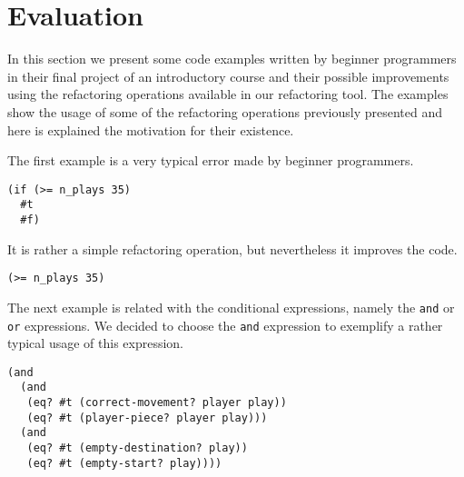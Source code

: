 

\section{Evaluation}
In this section we present some code examples written by beginner programmers
in their final project of an introductory course and their possible improvements
using the refactoring operations available in our refactoring tool.
The examples show the usage of some of the refactoring operations previously presented
and here is explained the motivation for their existence.

\lstset{style=racket}


The first example is a very typical error made by beginner programmers.
\begin{absolutelynopagebreak}
\begin{lstlisting}
(if (>= n_plays 35)
  #t
  #f)
\end{lstlisting}
It is rather a simple refactoring operation, but nevertheless it improves the code.
\begin{lstlisting}
(>= n_plays 35)
\end{lstlisting}
\end{absolutelynopagebreak}
The next example is related with the conditional expressions, namely the {\tt and}
or {\tt or} expressions. We decided to choose the {\tt and} expression to exemplify a
rather typical usage of this expression.
\begin{lstlisting}
(and
  (and
   (eq? #t (correct-movement? player play))
   (eq? #t (player-piece? player play)))
  (and
   (eq? #t (empty-destination? play))
   (eq? #t (empty-start? play))))
\end{lstlisting}


